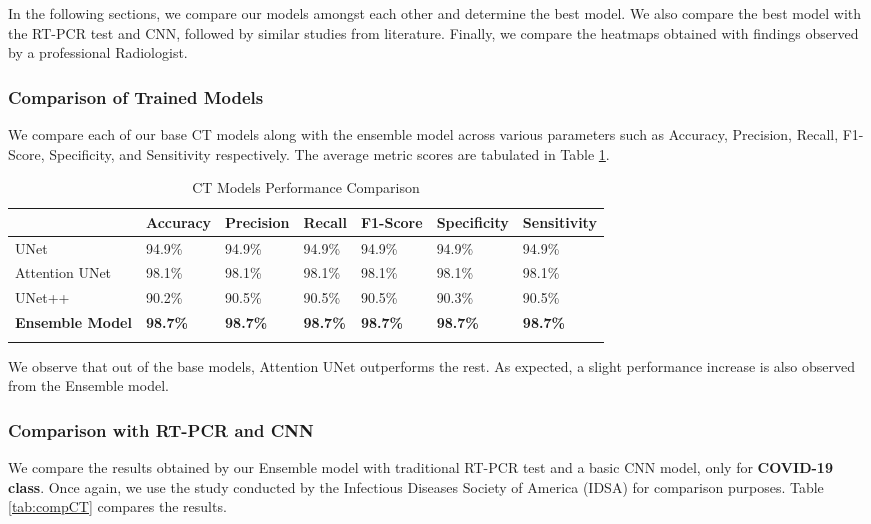In the following sections, we compare our models amongst each other and determine the best model. We also compare the best model with the RT-PCR test and CNN, followed by similar studies from literature. Finally, we compare the heatmaps obtained with findings observed by a professional Radiologist.

\subsubsection{Comparison of Trained Models}

We compare each of our base CT models along with the ensemble model across various parameters such as Accuracy, Precision, Recall, F1-Score, Specificity, and Sensitivity respectively. The average metric scores are tabulated in Table \ref{tab:mpcCT}.

\vspace{1em}
 \begin{longtable}{| p{} |  p{} |   p{} | p{} | p{} | p{} | p{} |} 
    \hline
& \textbf{Accuracy} & \textbf{Precision} & \textbf{Recall} & \textbf{F1-Score} & \textbf{Specificity} & \textbf{Sensitivity} \\
\hline
			UNet    &94.9\%   &94.9\%    &94.9\%    &94.9\%   &94.9\%   &94.9\% 
\\\hline
			Attention UNet    &98.1\%   &98.1\%    &98.1\%    &98.1\%   &98.1\%   &98.1\% 
\\\hline
			UNet++    &90.2\%   &90.5\%    &90.5\%    &90.5\%   &90.3\%   &90.5\% 
\\\hline
	        \textbf{Ensemble Model}    &\textbf{98.7\%}   &\textbf{98.7\%}    &\textbf{98.7\%}    &\textbf{98.7\%}   &\textbf{98.7\%}   &\textbf{98.7\%} 
\\\hline
 \caption{CT Models Performance Comparison}  \label{tab:mpcCT}

    \end{longtable}
\vspace{-1em}
We observe that out of the base models, Attention UNet outperforms the rest. As expected, a slight performance increase is also observed from the Ensemble model.

\subsubsection{Comparison with RT-PCR and CNN}

We compare the results obtained by our Ensemble model with traditional RT-PCR test and a basic CNN model, only for \textbf{COVID-19 class}. Once again, we use the study conducted by the Infectious Diseases Society of America (IDSA) \cite{IDS2020} for comparison purposes. Table \ref{tab:compCT} compares the results.

